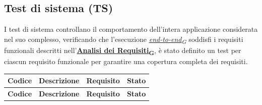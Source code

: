 \documentclass[12pt, a4paper]{article}
\newcommand{\urlglossario}{https://skynetunigroup.github.io/Code_Guardian/Documentazione/PB/glossario_v2.0.0.pdf} %
\newcommand{\glo}[2]{\href{\urlglossario\#nameddest=#2}{#1\textsubscript{G}}}
\newlength{\LargColVal} %
\begin{document}
\subsection{Test di sistema (TS)}
I test di sistema controllano il comportamento dell'intera applicazione considerata nel suo complesso, verificando che l'esecuzione \textit{\glo{end-to-end}{end-to-end}} soddisfi i requisiti funzionali descritti nell'\textbf{\glo{Analisi dei Requisiti}{analisi-dei-requisiti}}, è stato definito un test per ciascun requisito funzionale per garantire una copertura completa dei requisiti.


\renewcommand{\arraystretch}{1.3}
\begin{xltabular}{\textwidth}{|c|X|C{\LargColVal}|C{\LargColVal}|}

    \hline
    \textbf{Codice} & \textbf{Descrizione} & \textbf{Requisito} & \textbf{Stato} \\ \hline
    \endfirsthead

    \hline
    \textbf{Codice} & \textbf{Descrizione} & \textbf{Requisito} & \textbf{Stato} \\ \hline
    \endhead


\end{xltabular}
\end{document}
